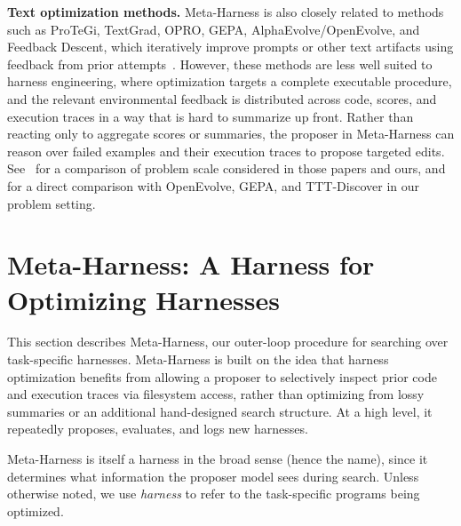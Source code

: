 \documentclass{article}
\begin{document}
\textbf{Text optimization methods.} Meta-Harness is also closely related to methods such as ProTeGi, TextGrad, OPRO, GEPA, AlphaEvolve/OpenEvolve, and Feedback Descent, which iteratively improve prompts or other text artifacts using feedback from prior attempts~\citep{pryzant2023protegi,madaan2023self,yuksekgonul2024textgradautomaticdifferentiationtext,yang2023large,agrawal2025gepa,novikov2025alphaevolve,openevolve,lee2025feedback}.
However, these methods are less well suited to harness engineering, where optimization targets a complete executable procedure, and the relevant environmental feedback is distributed across code, scores, and execution traces in a way that is hard to summarize up front.
Rather than reacting only to aggregate scores or summaries, the proposer in Meta-Harness can reason over failed examples and their execution traces to propose targeted edits.
See~ for a comparison of problem scale considered in those papers and ours, and~ for a direct comparison with OpenEvolve, GEPA, and TTT-Discover in our problem setting.


\section{Meta-Harness: A Harness for Optimizing Harnesses}
\label{sec:meta-harness}

This section describes Meta-Harness, our outer-loop procedure for searching over task-specific harnesses.
Meta-Harness is built on the idea that harness optimization benefits from allowing a proposer to selectively inspect prior code and execution traces via filesystem access, rather than optimizing from lossy summaries or an additional hand-designed search structure.
At a high level, it repeatedly proposes, evaluates, and logs new harnesses.

Meta-Harness is itself a harness in the broad sense (hence the name), since it determines what information the proposer model sees during search.
Unless otherwise noted, we use \emph{harness} to refer to the task-specific programs being optimized.
\end{document}
